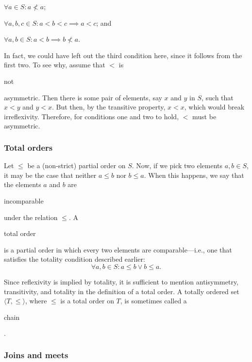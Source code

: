 \documentclass[11pt]{article}
\theoremstyle{plain}
\theoremstyle{definition}
\newenvironment{packed_enum}{
\begin{enumerate}
  \setlength{\itemsep}{1pt}
  \setlength{\parskip}{0pt}
  \setlength{\parsep}{0pt}
}{\end{enumerate}}
\begin{document}
\begin{packed_enum}
  \item $ \forall a \in S : a \not < a $;
  \item $ \forall a, b, c \in S : a < b < c \implies a < c $; and
  \item $ \forall a, b \in S : a < b \implies b \not < a $.
\end{packed_enum}

\noindent In fact, we could have left out the third condition here, since it follows from the first two.
To see why, assume that $ < $ is \begin{em}not\end{em} asymmetric. Then there is some pair of elements, say $ x $ and $ y $ in $ S $, such that $ x < y $ and $ y < x $. But then, by the transitive property, $ x < x $, which would break irreflexivity. Therefore, for conditions one and two to hold, $ < $ must be asymmetric.

\subsubsection*{Total orders}

Let $ \le $ be a (non-strict) partial order on $ S $. Now, if we pick two elements $ a, b \in S $, it may be the case that neither $ a \le b $ nor $ b \le a $. When this happens, we say that the elements $ a $ and $ b $ are \begin{em}incomparable\end{em} under the relation $ \le $.
A \begin{em}total order\end{em} is a partial order in which every two elements are comparable---i.e., one that satisfies the totality condition described earlier:
$$
  \forall a, b \in S : a \le b \vee b \le a.
$$

\noindent Since reflexivity is implied by totality, it is sufficient to mention antisymmetry, transitivity, and totality in the definition of a total order. A totally ordered set $ \langle T, \le \rangle $, where $ \le $ is a total order on $ T $, is sometimes called a \begin{em}chain\end{em}.

\subsubsection*{Joins and meets}
\end{document}

